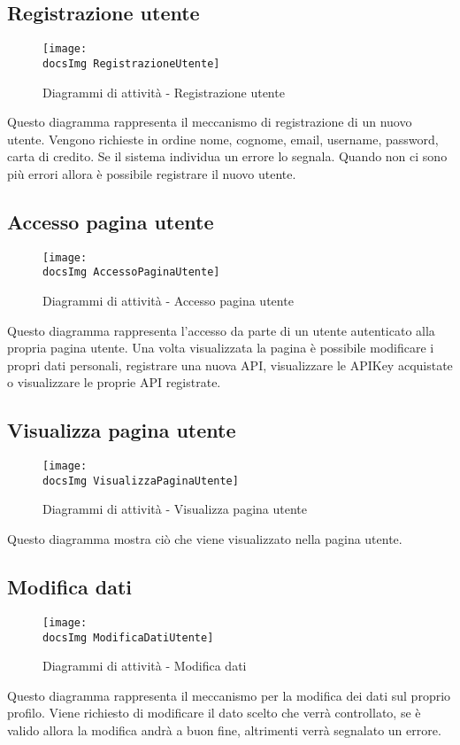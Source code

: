 {	\subsection{Registrazione utente}{
		\begin{figure}[H]
			\centering
			\texttt{[image: \\docsImg RegistrazioneUtente]}
			\caption{Diagrammi di attività - Registrazione utente}
		\end{figure}
			Questo diagramma rappresenta il meccanismo di registrazione di un nuovo utente. Vengono richieste in ordine nome, cognome, email, username, password, carta di credito. Se il sistema individua un errore lo segnala. Quando non ci sono più errori allora è possibile registrare il nuovo utente. 
	}
	\subsection{Accesso pagina utente}{
		\begin{figure}[H]
			\centering
			\texttt{[image: \\docsImg AccessoPaginaUtente]}
			\caption{Diagrammi di attività - Accesso pagina utente}
		\end{figure}
			Questo diagramma rappresenta l'accesso da parte di un utente autenticato alla propria pagina utente. Una volta visualizzata la pagina è possibile modificare i propri dati personali, registrare una nuova API, visualizzare le APIKey acquistate o visualizzare le proprie API registrate. 
	}
	\subsection{Visualizza pagina utente}{
		\begin{figure}[H]
			\centering
			\texttt{[image: \\docsImg VisualizzaPaginaUtente]}
			\caption{Diagrammi di attività - Visualizza pagina utente}
		\end{figure}
			Questo diagramma mostra ciò che viene visualizzato nella pagina utente.  	
	}	
	\subsection{Modifica dati}{
		\begin{figure}[H]
			\centering
			\texttt{[image: \\docsImg ModificaDatiUtente]}
			\caption{Diagrammi di attività - Modifica dati}
		\end{figure}
			Questo diagramma rappresenta il meccanismo per la modifica dei dati sul proprio profilo. Viene richiesto di modificare il dato scelto che verrà controllato, se è valido allora la modifica andrà a buon fine, altrimenti verrà segnalato un errore. 	
	}
}
